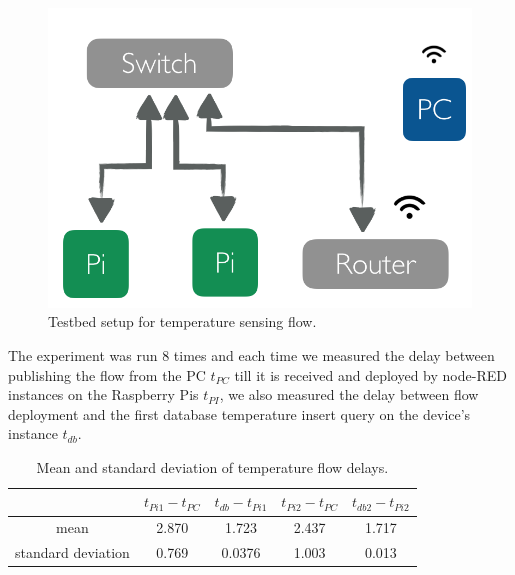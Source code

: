  \begin{figure}[H]
	\centering
	\includegraphics[scale=0.6]{images/tb-temp.png}
	\caption{Testbed setup for temperature sensing flow.}
	\label{fig:tb-temp}
\end{figure} 

\noindent The experiment was run 8 times and each time  we measured the delay between publishing the flow from the PC $ t_{PC}$ till it is received and deployed by  node-RED instances on the Raspberry Pis $t_{PI}$, we also measured the delay between flow deployment and the first database temperature insert query on the device's instance $t_{db}$. 
\begin{table}[H]
	\centering
	\begin{tabular}{c|c|c|c|c}\toprule
		&  $ t_{Pi1} - t_{PC}$   & $t_{db} - t_{Pi1}$  & $ t_{Pi2} - t_{PC}$ &  $t_{db2} - t_{Pi2}$ \\ \midrule
mean &2.870&	1.723&	2.437&	1.717\\
standard deviation& 0.769	&0.0376&	1.003&	0.013\\
	\end{tabular}
	\caption{Mean and standard deviation of temperature flow delays.}
	\label{table:temp}
\end{table}

